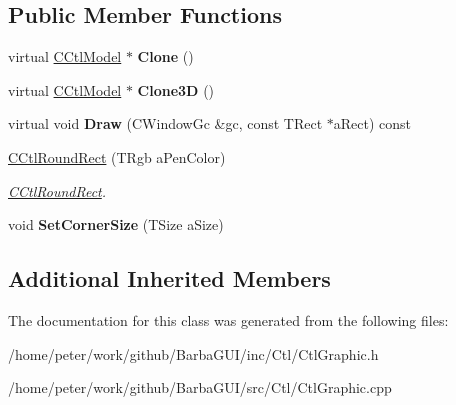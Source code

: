 \subsection*{Public Member Functions}
\begin{DoxyCompactItemize}
\item 
\mbox{\label{classCCtlRoundRect_a3157984a6caeb5294c9cf978a9bf991e}} 
virtual \hyperlink{classCCtlModel}{C\+Ctl\+Model} $\ast$ {\bfseries Clone} ()
\item 
\mbox{\label{classCCtlRoundRect_a7db0f2b41845cbaa673d1c0342b494da}} 
virtual \hyperlink{classCCtlModel}{C\+Ctl\+Model} $\ast$ {\bfseries Clone3D} ()
\item 
\mbox{\label{classCCtlRoundRect_ac1e54eafbd2af874b0b845691e7beb3a}} 
virtual void {\bfseries Draw} (C\+Window\+Gc \&gc, const T\+Rect $\ast$a\+Rect) const
\item 
\mbox{\label{classCCtlRoundRect_a14f57faf4eaf70818cbe9309a0d82109}} 
\hyperlink{classCCtlRoundRect_a14f57faf4eaf70818cbe9309a0d82109}{C\+Ctl\+Round\+Rect} (T\+Rgb a\+Pen\+Color)
\begin{DoxyCompactList}\small\item\em \hyperlink{classCCtlRoundRect}{C\+Ctl\+Round\+Rect}. \end{DoxyCompactList}\item 
\mbox{\label{classCCtlRoundRect_acbcfb1d6dc856ef8056cc8d60577efb9}} 
void {\bfseries Set\+Corner\+Size} (T\+Size a\+Size)
\end{DoxyCompactItemize}
\subsection*{Additional Inherited Members}


The documentation for this class was generated from the following files\+:\begin{DoxyCompactItemize}
\item 
/home/peter/work/github/\+Barba\+G\+U\+I/inc/\+Ctl/Ctl\+Graphic.\+h\item 
/home/peter/work/github/\+Barba\+G\+U\+I/src/\+Ctl/Ctl\+Graphic.\+cpp\end{DoxyCompactItemize}
